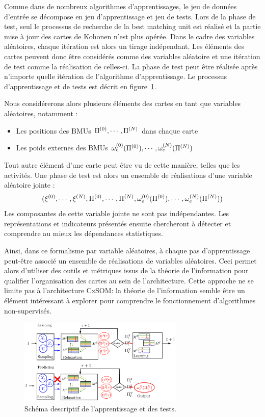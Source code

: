 Comme dans de nombreux algorithmes d'apprentissages, le jeu de données d'entrée se décompose en jeu d'apprentissage et jeu de tests. Lors de la phase de test, seul le processus de recherche de la best matching unit est réalisé et la partie mise à jour des cartes de Kohonen n'est plus opérée. Dans le cadre des variables aléatoires, chaque itération est alors un tirage indépendant. Les éléments des cartes peuvent donc être considérés comme des variables aléatoire et une itération de test comme la réalisation de celles-ci. La phase de test peut être réalisée après n'importe quelle itération de l'algorithme d'apprentissage. Le processus d'apprentissage et de tests est décrit en figure~\ref{fig:flowchart}.

Nous considérerons alors plusieurs éléments des cartes en tant que variables aléatoires, notamment :  
\begin{itemize}
\item Les positions des BMUs $\Pi^{({0})}, \cdots, \Pi^{({N})}$ dans chaque carte
\item Les poids externes des BMUs $\omega_e^{({0})}(\Pi^{({0})}), \cdots, \omega_e^{({N})}(\Pi^{({N})})$
\end{itemize}
Tout autre élément d'une carte peut être vu de cette manière, telles que les activités. 
Une phase de test est alors un ensemble de réalisations d'une variable aléatoire jointe : 
$$(\xi^{({0})}, \cdots, \xi^{({N})}, \Pi^{({0})}, \cdots, \Pi^{({N})}, \omega_e^{({0})}(\Pi^{({0})}), \cdots, \omega_e^{({N})}(\Pi^{({N})}))$$
Les composantes de cette variable jointe ne sont pas indépendantes. Les représentations et indicateurs présentés ensuite chercheront à détecter et comprendre au mieux les dépendances statistiques.

Ainsi, dans ce formalisme par variable aléatoires, à chaque pas d'apprentissage peut-être associé un ensemble de réalisations de variables aléatoires. Ceci permet alors d'utiliser des outils et métriques issus de la théorie de l'information pour qualifier l'organisation des cartes au sein de l'architecture. Cette approche ne se limite pas à l'architecture CxSOM: la théorie de l'information semble être un élément intéressant à explorer pour comprendre le fonctionnement d'algorithmes non-supervisés.

\begin{figure}
\centering
\includegraphics[width=0.7\textwidth]{learning_tests.pdf}
\caption{Schéma descriptif de l'apprentissage et des tests.}
\label{fig:flowchart}
\end{figure}


